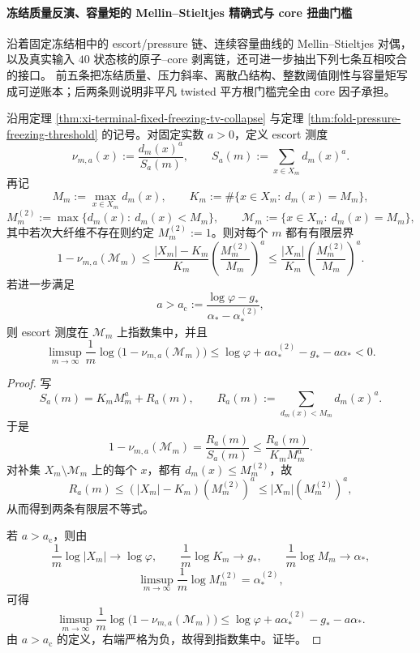 \paragraph{冻结质量反演、容量矩的 Mellin--Stieltjes 精确式与 core 扭曲门槛}
沿着固定冻结相中的 escort/pressure 链、连续容量曲线的 Mellin--Stieltjes 对偶，
以及真实输入 \(40\) 状态核的原子--core 剥离链，还可进一步抽出下列七条互相咬合的接口。
前五条把冻结质量、压力斜率、离散凸结构、整数阈值刚性与容量矩写成可逆账本；后两条则说明非平凡 twisted 平方根门槛完全由 core 因子承担。

\begin{theorem}\label{thm:xi-time-part57b-escort-maxfiber-layer-concentration}
沿用定理 \ref{thm:xi-terminal-fixed-freezing-tv-collapse} 与定理
\ref{thm:fold-pressure-freezing-threshold} 的记号。对固定实数 \(a>0\)，定义 escort 测度
\[
\nu_{m,a}(x):=\frac{d_m(x)^a}{S_a(m)},
\qquad
S_a(m):=\sum_{x\in X_m}d_m(x)^a.
\]
再记
\[
M_m:=\max_{x\in X_m}d_m(x),\qquad
K_m:=\#\{x\in X_m:\ d_m(x)=M_m\},
\]
\[
M_m^{(2)}:=\max\{d_m(x):\ d_m(x)<M_m\},
\qquad
\mathcal M_m:=\{x\in X_m:\ d_m(x)=M_m\},
\]
其中若次大纤维不存在则约定 \(M_m^{(2)}:=1\)。则对每个 \(m\) 都有有限层界
\[
\boxed{\;
1-\nu_{m,a}(\mathcal M_m)
\le
\frac{|X_m|-K_m}{K_m}\left(\frac{M_m^{(2)}}{M_m}\right)^a
\le
\frac{|X_m|}{K_m}\left(\frac{M_m^{(2)}}{M_m}\right)^a.\;}
\]
若进一步满足
\[
a>a_{\mathrm c}:=\frac{\log\varphi-g_*}{\alpha_*-\alpha_*^{(2)}},
\]
则 escort 测度在 \(\mathcal M_m\) 上指数集中，并且
\[
\limsup_{m\to\infty}\frac1m
\log\bigl(1-\nu_{m,a}(\mathcal M_m)\bigr)
\le
\log\varphi+a\alpha_*^{(2)}-g_*-a\alpha_*<0.
\]
\end{theorem}
\begin{proof}
写
\[
S_a(m)=K_mM_m^a+R_a(m),
\qquad
R_a(m):=\sum_{d_m(x)<M_m}d_m(x)^a.
\]
于是
\[
1-\nu_{m,a}(\mathcal M_m)=\frac{R_a(m)}{S_a(m)}
\le
\frac{R_a(m)}{K_mM_m^a}.
\]
对补集 \(X_m\setminus\mathcal M_m\) 上的每个 \(x\)，都有 \(d_m(x)\le M_m^{(2)}\)，故
\[
R_a(m)\le (|X_m|-K_m)(M_m^{(2)})^a
\le |X_m|(M_m^{(2)})^a,
\]
从而得到两条有限层不等式。

若 \(a>a_{\mathrm c}\)，则由
\[
\frac1m\log|X_m|\to\log\varphi,\qquad
\frac1m\log K_m\to g_*,
\qquad
\frac1m\log M_m\to\alpha_*,
\]
\[
\limsup_{m\to\infty}\frac1m\log M_m^{(2)}=\alpha_*^{(2)},
\]
可得
\[
\limsup_{m\to\infty}\frac1m
\log\bigl(1-\nu_{m,a}(\mathcal M_m)\bigr)
\le
\log\varphi+a\alpha_*^{(2)}-g_*-a\alpha_*.
\]
由 \(a>a_{\mathrm c}\) 的定义，右端严格为负，故得到指数集中。证毕。
\end{proof}

